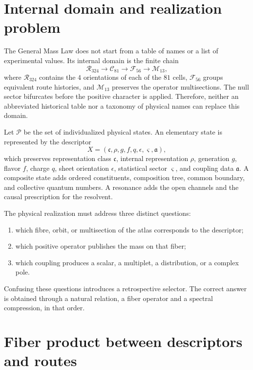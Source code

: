 \section{Internal domain and realization problem}

The General Mass Law does not start from a table of names or a list of
experimental values. Its internal domain is the finite chain
\[
 \mathcal R_{324}\longrightarrow \mathcal C_{81}
 \longrightarrow \mathcal F_{56}\longrightarrow \mathcal M_{13},
\]
where \(\mathcal R_{324}\) contains the \(4\) orientations of each of the
\(81\) cells, \(\mathcal F_{56}\) groups equivalent route histories, and
\(\mathcal M_{13}\) preserves the operator multisections. The null sector
bifurcates before the positive character is applied. Therefore, neither an
abbreviated historical table nor a taxonomy of physical names can replace this
domain.

Let \(\mathcal P\) be the set of individualized physical states. An elementary
state is represented by the descriptor
\[
 X=(\mathfrak c,\rho,g,f,q,\epsilon,\varsigma,\mathfrak a),
\]
which preserves representation class \(\mathfrak c\), internal representation
\(\rho\), generation \(g\), flavor \(f\), charge \(q\), sheet orientation
\(\epsilon\), statistical sector \(\varsigma\), and coupling data
\(\mathfrak a\). A composite state adds ordered constituents, composition
tree, common boundary, and collective quantum numbers. A resonance
adds the open channels and the causal prescription for the resolvent.

The physical realization must address three distinct questions:

\begin{enumerate}
\item which fibre, orbit, or multisection of the atlas corresponds to the descriptor;
\item which positive operator publishes the mass on that fiber;
\item which coupling produces a scalar, a multiplet, a distribution, or
      a complex pole.
\end{enumerate}

Confusing these questions introduces a retrospective selector. The correct
answer is obtained through a natural relation, a fiber operator and a
spectral compression, in that order.

\section{Fiber product between descriptors and routes}

